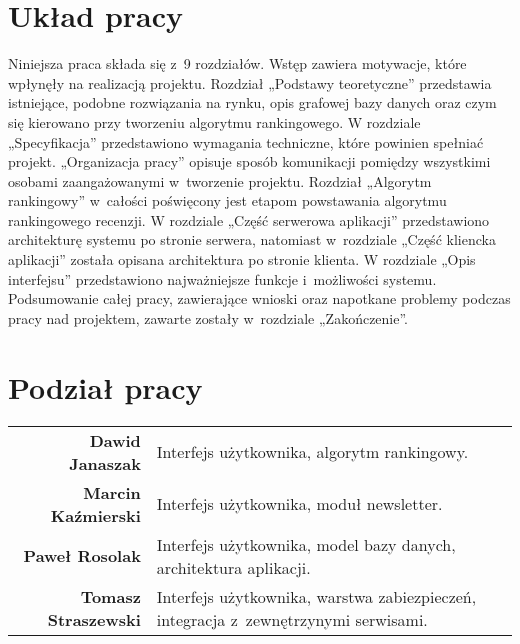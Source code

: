 \section{Układ pracy}
Niniejsza praca składa się z~9 rozdziałów. Wstęp zawiera motywacje, które wpłynęły na realizacją projektu. Rozdział „Podstawy teoretyczne” przedstawia istniejące, podobne rozwiązania na rynku, opis grafowej bazy danych oraz czym się kierowano przy tworzeniu algorytmu rankingowego. W rozdziale „Specyfikacja” przedstawiono wymagania techniczne, które powinien spełniać projekt. „Organizacja pracy” opisuje sposób komunikacji pomiędzy wszystkimi osobami zaangażowanymi w~tworzenie projektu.  Rozdział „Algorytm rankingowy” w~całości poświęcony jest etapom powstawania algorytmu rankingowego recenzji. W rozdziale „Część serwerowa aplikacji” przedstawiono architekturę systemu po stronie serwera, natomiast w~rozdziale „Część kliencka aplikacji” została opisana architektura po stronie klienta. W rozdziale „Opis interfejsu” przedstawiono najważniejsze funkcje i~możliwości systemu. Podsumowanie całej pracy, zawierające wnioski oraz napotkane problemy podczas pracy nad projektem, zawarte zostały w~rozdziale „Zakończenie”.


\section{Podział pracy}
\noindent\begin{tabular}{rp{9cm}}
\textbf{Dawid Janaszak} & Interfejs użytkownika, algorytm rankingowy.\\

\textbf{Marcin Kaźmierski} & Interfejs użytkownika, moduł newsletter.\\

\textbf{Paweł Rosolak} & Interfejs użytkownika, model bazy danych, architektura aplikacji.\\

\textbf{Tomasz Straszewski} & Interfejs użytkownika, warstwa zabiezpieczeń, integracja z~zewnętrzynymi serwisami.\\
\end{tabular}

